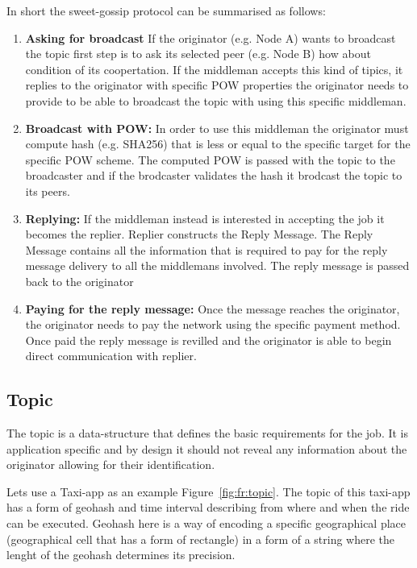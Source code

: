 \documentclass{article}
\begin{document}
In short the sweet-gossip protocol can be summarised as follows:

\begin{enumerate}
	\item  \textbf{Asking for broadcast} If the originator (e.g. Node A) wants to broadcast the topic first step is to ask its selected peer (e.g. Node B) how about condition of its coopertation. If the middleman accepts this kind of tipics, it replies to the originator with specific POW properties the originator needs to provide to be able to broadcast the topic with using this specific middleman.
	\item  \textbf{Broadcast with POW:} In order to use this middleman the originator must compute hash (e.g. SHA256) that is less or equal to the specific target for the specific POW scheme. The computed POW is passed with the topic to the broadcaster and if the brodcaster validates the hash it brodcast the topic to its peers.
	\item  \textbf{Replying:} If the middleman instead is interested in accepting the job it becomes the replier. Replier constructs the Reply Message. The Reply Message contains all the information that is required to pay for the reply message delivery to all the middlemans involved. The reply message is passed back to the originator
	\item  \textbf{Paying for the reply message:} Once the message reaches the originator, the originator needs to pay the network using the specific payment method. Once paid the reply message is revilled and the originator is able to begin direct communication with replier.
\end{enumerate}

\subsection{Topic}

The topic is a data-structure that defines the basic requirements for the job. It is application specific and by design it should not reveal any information about the originator allowing for their identification.

Lets use a Taxi-app as an example {Figure~\ref{fig:fr:topic}}. The topic of this taxi-app has a form of geohash and time interval describing from where and when the ride can be executed. Geohash here is a way of encoding a specific geographical place (geographical cell that has a form of rectangle) in a form of a string where the lenght of the geohash determines its precision.
\end{document}
